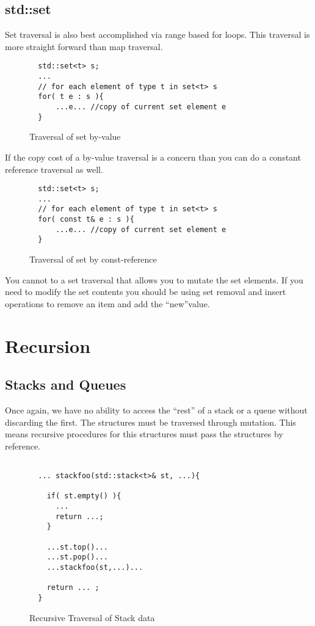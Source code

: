 \documentclass[nobib]{tufte-handout}
\begin{document}
\subsection{std::set}

Set traversal is also best accomplished via range based for loops. This traversal is more straight forward than map traversal.

\begin{figure}[!htbp]
\begin{lstlisting}
  std::set<t> s;
  ...
  // for each element of type t in set<t> s
  for( t e : s ){
      ...e... //copy of current set element e
  }
\end{lstlisting}
\caption{Traversal of set by-value}
\end{figure}

If the copy cost of a by-value traversal is a concern than you can do a constant reference traversal as well.

\begin{figure}[!htbp]
\begin{lstlisting}
  std::set<t> s;
  ...
  // for each element of type t in set<t> s
  for( const t& e : s ){
      ...e... //copy of current set element e
  }
\end{lstlisting}
\caption{Traversal of set by const-reference}
\end{figure}

You cannot to a set traversal that allows you to mutate the set elements.  If you need to modify the set contents you should be using set removal and insert operations to remove an item and add the ``new''value.

\section{Recursion}

\subsection{Stacks and Queues}

Once again, we have no ability to access the ``rest'' of a stack or a queue without discarding the first. The structures must be traversed through mutation. This means recursive procedures for this structures must pass the structures by reference.

\begin{figure}[!htbp]
\begin{lstlisting}

  ... stackfoo(std::stack<t>& st, ...){

    if( st.empty() ){
      ...
      return ...;
    }

    ...st.top()...
    ...st.pop()...
    ...stackfoo(st,...)...

    return ... ;
  }
\end{lstlisting}
\caption{Recursive Traversal of Stack data}
\end{figure}
\end{document}
